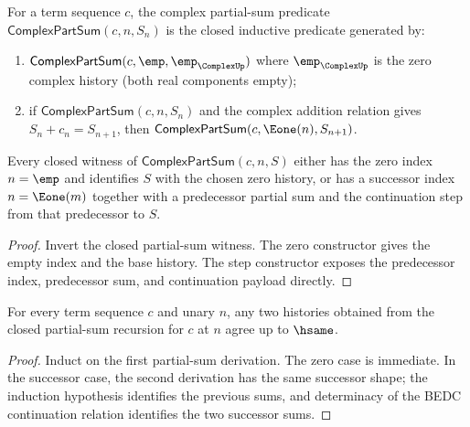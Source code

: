 \begin{definition}
\label{def:complex-part-sum}
For a term sequence \(c\), the complex partial-sum predicate \(\mathsf{ComplexPartSum}(c, n, S_n)\) is the closed inductive predicate generated by:
\begin{enumerate}
  \item \(\mathsf{ComplexPartSum}(c, \emp, \emp_{\ComplexUp})\) where \(\emp_{\ComplexUp}\) is the zero complex history (both real components empty);
  \item if \(\mathsf{ComplexPartSum}(c, n, S_n)\) and the complex addition relation gives \(S_n + c_n = S_{n+1}\), then \(\mathsf{ComplexPartSum}(c, \Eone(n), S_{n+1})\).
\end{enumerate}
\end{definition}

\begin{lemma}
\label{lem:complex-part-sum-index-cases}
Every closed witness of $\mathsf{ComplexPartSum}(c,n,S)$ either has the zero
index $n=\emp$ and identifies $S$ with the chosen zero history, or has a
successor index $n=\Eone(m)$ together with a predecessor partial sum and the
continuation step from that predecessor to $S$.
\end{lemma}
\begin{proof}
Invert the closed partial-sum witness. The zero constructor gives the empty
index and the base history. The step constructor exposes the predecessor index,
predecessor sum, and continuation payload directly.
\end{proof}

\begin{lemma}
\label{lem:complex-part-sum-well-defined}
For every term sequence \(c\) and unary \(n\), any two histories obtained from
the closed partial-sum recursion for \(c\) at \(n\) agree up to \(\hsame\).
\end{lemma}
\begin{proof}
Induct on the first partial-sum derivation. The zero case is immediate. In the
successor case, the second derivation has the same successor shape; the
induction hypothesis identifies the previous sums, and determinacy of the BEDC
continuation relation identifies the two successor sums.
\end{proof}

